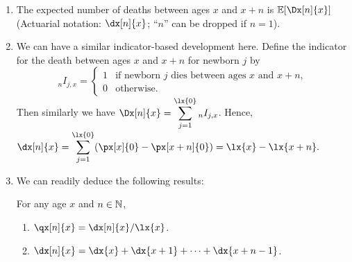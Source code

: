 \begin{enumerate}
\item The expected number of deaths between ages \(x\) and \(x+n\) is
\(\expv{\Dx[n]{x}}\) (Actuarial notation: \(\dx[n]{x}\); ``\(n\)'' can be
dropped if \(n=1\)).
\item We can have a similar indicator-based development here. Define the
indicator for the death between ages \(x\) and \(x+n\) for newborn \(j\) by
\[
{}_n I_{j,x}=
\begin{cases}
1&\text{if newborn \(j\) dies between ages \(x\) and \(x+n\)},\\
0&\text{otherwise}.
\end{cases}
\]
Then similarly we have
\(\displaystyle\Dx[n]{x}=\sum_{j=1}^{\lx{0}}{}_nI_{j,x}\). Hence,
\(\displaystyle\dx[n]{x}=\sum_{j=1}^{\lx{0}}(\px[x]{0}-\px[x+n]{0})=\lx{x}-\lx{x+n}.\)
\item We can readily deduce the following results:
\begin{proposition}
\label{prp:life-table-relationships}
For any age \(x\) and \(n\in\mathbb{N}\),
\begin{enumerate}
\item \(\qx[n]{x}=\dx[n]{x}/\lx{x}\).
\item \(\dx[n]{x}=\dx{x}+\dx{x+1}+\dotsb+\dx{x+n-1}\).
\end{enumerate}
\end{proposition}
\end{enumerate}
